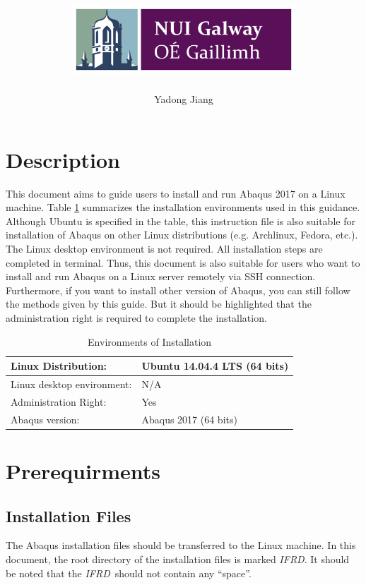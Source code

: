 \documentclass[12pt]{article}
\title{\includegraphics[height=1in]{Figures/NUIG_Logo.jpg} \vspace{100pt} \\ \tit}
\author[1]{Yadong Jiang}
\affil[1]{College of Engineering and Informatics, National University of Ireland Galway}
\date{}
\newcommand{\ifp}{\textit{IFRD}}
\begin{document}
\maketitle

\newpage

\section*{Description}
This document aims to guide users to install and run Abaqus 2017 on a Linux machine. Table \ref{tb-1} summarizes the installation environments used in this guidance. Although Ubuntu is specified in the table, this instruction file is also suitable for installation of Abaqus on other Linux distributions (e.g. Archlinux, Fedora, etc.). The Linux desktop environment is not required. All installation steps are completed in terminal. Thus, this document is also suitable for users who want to install and run Abaqus on a Linux server remotely via SSH connection. Furthermore, if you want to install other version of Abaqus, you can still follow the methods given by this guide. But it should be highlighted that the administration right is required to complete the installation.

\begin{table}[h!]
\caption{Environments of Installation}
\begin{center}
\begin{tabular}{l l}
    \hline
    Linux Distribution: & Ubuntu 14.04.4 LTS (64 bits)\\
    \hline
    Linux desktop environment: & N/A \\
    \hline
    Administration Right: & Yes \\
    \hline
    Abaqus version: & Abaqus 2017 (64 bits) \\
    \hline
\end{tabular}
\end{center}
\label{tb-1}
\end{table}

\section*{Prerequirments}
\subsection*{Installation Files}
The Abaqus installation files should be transferred to the Linux machine. In this document, the root directory of the installation files is marked \ifp. It should be noted that the \ifp\ should not contain any ``space''.
\end{document}
